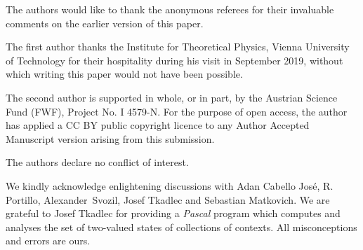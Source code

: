 \documentclass[%
12pt,
prereprint,
showpacs,
showkeys,
preprintnumbers,
amsmath,amssymb,
aps,
pra,
longbibliography,
notitlepage
]{revtex4-1}
\theoremstyle{definition}
\begin{document}
        \begin{acknowledgments}
            The authors would like to thank the anonymous referees for their  invaluable comments on the earlier version of this paper.

            The first author thanks the Institute for Theoretical Physics, Vienna University of Technology for their hospitality during his visit in September 2019, without which writing this paper would not have been possible.

                The second author is supported in whole, or in part, by the Austrian Science Fund (FWF), Project No. I 4579-N. For the purpose of open access, the author has applied a CC BY public copyright licence to any Author Accepted Manuscript version arising from this submission.

                The authors declare no conflict of interest.

                We kindly acknowledge enlightening discussions with Adan Cabello Jos\'{e}, R. Portillo,
                Alexander~Svozil, Josef Tkadlec and Sebastian Matkovich.
                We are grateful to Josef Tkadlec for providing a {\em Pascal} program
                which computes and analyses the set of two-valued states of collections of contexts.
                All misconceptions and errors are ours.
        \end{acknowledgments}










        




\end{document}
